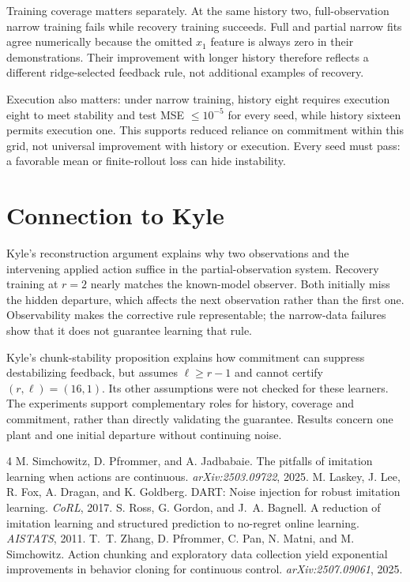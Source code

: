 \documentclass{l4dc2026}
\begin{document}
Training coverage matters separately. At the same history two, full-observation narrow training fails while recovery training succeeds. Full and partial narrow fits agree numerically because the omitted $x_1$ feature is always zero in their demonstrations. Their improvement with longer history therefore reflects a different ridge-selected feedback rule, not additional examples of recovery.

Execution also matters: under narrow training, history eight requires execution eight to meet stability and test MSE $\le10^{-5}$ for every seed, while history sixteen permits execution one. This supports reduced reliance on commitment within this grid, not universal improvement with history or execution. Every seed must pass: a favorable mean or finite-rollout loss can hide instability.

\section{Connection to Kyle}
Kyle's reconstruction argument explains why two observations and the intervening applied action suffice in the partial-observation system. Recovery training at $r=2$ nearly matches the known-model observer. Both initially miss the hidden departure, which affects the next observation rather than the first one. Observability makes the corrective rule representable; the narrow-data failures show that it does not guarantee learning that rule.

Kyle's chunk-stability proposition explains how commitment can suppress destabilizing feedback, but assumes $\ell\ge r-1$ and cannot certify $(r,\ell)=(16,1)$. Its other assumptions were not checked for these learners. The experiments support complementary roles for history, coverage and commitment, rather than directly validating the guarantee. Results concern one plant and one initial departure without continuing noise.

\footnotesize
\begin{thebibliography}{4}\setlength{\itemsep}{2pt}
M. Simchowitz, D. Pfrommer, and A. Jadbabaie.
The pitfalls of imitation learning when actions are continuous.
\emph{arXiv:2503.09722}, 2025.
M. Laskey, J. Lee, R. Fox, A. Dragan, and K. Goldberg.
DART: Noise injection for robust imitation learning. \emph{CoRL}, 2017.
S. Ross, G. Gordon, and J.~A. Bagnell.
A reduction of imitation learning and structured prediction to no-regret online learning. \emph{AISTATS}, 2011.
T.~T. Zhang, D. Pfrommer, C. Pan, N. Matni, and M. Simchowitz.
Action chunking and exploratory data collection yield exponential improvements in behavior cloning for continuous control. \emph{arXiv:2507.09061}, 2025.
\end{thebibliography}
\end{document}
